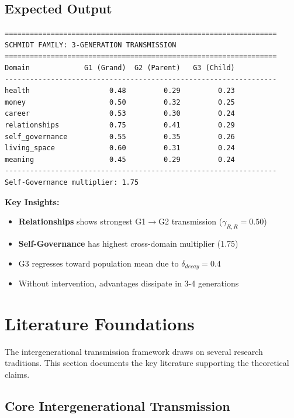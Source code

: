 \subsection{Expected Output}

\begin{verbatim}
=================================================================
SCHMIDT FAMILY: 3-GENERATION TRANSMISSION
=================================================================
Domain             G1 (Grand)  G2 (Parent)   G3 (Child)
-----------------------------------------------------------------
health                   0.48         0.29         0.23
money                    0.50         0.32         0.25
career                   0.53         0.30         0.24
relationships            0.75         0.41         0.29
self_governance          0.55         0.35         0.26
living_space             0.60         0.31         0.24
meaning                  0.45         0.29         0.24
-----------------------------------------------------------------
Self-Governance multiplier: 1.75
\end{verbatim}

\textbf{Key Insights:}
\begin{itemize}[nosep]
\item \textbf{Relationships} shows strongest G1$\to$G2 transmission ($\gamma_{R,R}=0.50$)
\item \textbf{Self-Governance} has highest cross-domain multiplier (1.75)
\item G3 regresses toward population mean due to $\delta_{decay}=0.4$
\item Without intervention, advantages dissipate in 3-4 generations
\end{itemize}


\section{Literature Foundations}
\label{sec:BI-literature}

The intergenerational transmission framework draws on several research traditions.
This section documents the key literature supporting the theoretical claims.

\subsection{Core Intergenerational Transmission}

